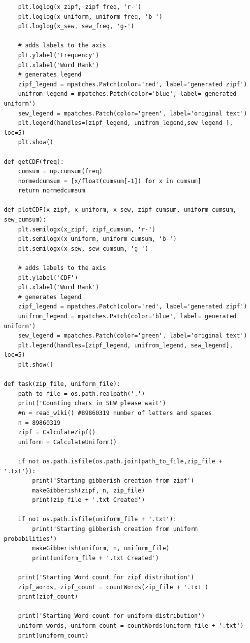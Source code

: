 \documentclass{WeSTassignment}
\begin{document}
\begin{lstlisting}
    plt.loglog(x_zipf, zipf_freq, 'r-')
    plt.loglog(x_uniform, uniform_freq, 'b-')
    plt.loglog(x_sew, sew_freq, 'g-')

    # adds labels to the axis
    plt.ylabel('Frequency')
    plt.xlabel('Word Rank')
    # generates legend
    zipf_legend = mpatches.Patch(color='red', label='generated zipf')
    unifrom_legend = mpatches.Patch(color='blue', label='generated uniform')
    sew_legend = mpatches.Patch(color='green', label='original text')
    plt.legend(handles=[zipf_legend, unifrom_legend,sew_legend ], loc=5)
    plt.show()

def getCDF(freq):
    cumsum = np.cumsum(freq)
    normedcumsum = [x/float(cumsum[-1]) for x in cumsum]
    return normedcumsum

def plotCDF(x_zipf, x_uniform, x_sew, zipf_cumsum, uniform_cumsum, sew_cumsum):
    plt.semilogx(x_zipf, zipf_cumsum, 'r-')
    plt.semilogx(x_uniform, uniform_cumsum, 'b-')
    plt.semilogx(x_sew, sew_cumsum, 'g-')

    # adds labels to the axis
    plt.ylabel('CDF')
    plt.xlabel('Word Rank')
    # generates legend
    zipf_legend = mpatches.Patch(color='red', label='generated zipf')
    unifrom_legend = mpatches.Patch(color='blue', label='generated uniform')
    sew_legend = mpatches.Patch(color='green', label='original text')
    plt.legend(handles=[zipf_legend, unifrom_legend, sew_legend], loc=5)
    plt.show()

def task(zip_file, uniform_file):
    path_to_file = os.path.realpath('.')
    print('Counting chars in SEW please wait')
    #n = read_wiki() #89860319 number of letters and spaces
    n = 89860319
    zipf = CalculateZipf()
    uniform = CalculateUniform()

    if not os.path.isfile(os.path.join(path_to_file,zip_file + '.txt')):
        print('Starting gibberish creation from zipf')
        makeGibberish(zipf, n, zip_file)
        print(zip_file + '.txt Created')

    if not os.path.isfile(uniform_file + '.txt'):
        print('Starting gibberish creation from uniform probabilities')
        makeGibberish(uniform, n, uniform_file)
        print(uniform_file + '.txt Created')

    print('Starting Word count for zipf distribution')
    zipf_words, zipf_count = countWords(zip_file + '.txt')
    print(zipf_count)

    print('Starting Word count for uniform distribution')
    uniform_words, uniform_count = countWords(uniform_file + '.txt')
    print(uniform_count)


\end{lstlisting}
\end{document}
